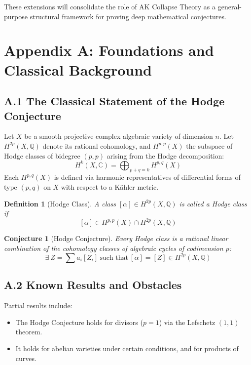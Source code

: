\documentclass[11pt]{article}
\newtheorem{definition}[theorem]{Definition}
\newtheorem{conjecture}{Conjecture}[section]
\begin{document}
These extensions will consolidate the role of AK Collapse Theory as a general-purpose structural framework for proving deep mathematical conjectures.



\appendix

\section*{Appendix A: Foundations and Classical Background}


\subsection*{A.1 The Classical Statement of the Hodge Conjecture}

Let $X$ be a smooth projective complex algebraic variety of dimension $n$.  
Let $H^{2p}(X, \mathbb{Q})$ denote its rational cohomology, and $H^{p,p}(X)$ the subspace of Hodge classes of bidegree $(p,p)$ arising from the Hodge decomposition:
\[
H^k(X, \mathbb{C}) = \bigoplus_{p+q=k} H^{p,q}(X)
\]
Each $H^{p,q}(X)$ is defined via harmonic representatives of differential forms of type $(p,q)$ on $X$ with respect to a Kähler metric.

\begin{definition}[Hodge Class]
A class $[\alpha] \in H^{2p}(X, \mathbb{Q})$ is called a \emph{Hodge class} if
\[
[\alpha] \in H^{p,p}(X) \cap H^{2p}(X, \mathbb{Q})
\]
\end{definition}

\begin{conjecture}[Hodge Conjecture]
Every Hodge class is a rational linear combination of the cohomology classes of algebraic cycles of codimension $p$:
\[
\exists \ Z = \sum a_i [Z_i] \ \text{such that} \ [\alpha] = [Z] \in H^{2p}(X, \mathbb{Q})
\]
\end{conjecture}

\subsection*{A.2 Known Results and Obstacles}

Partial results include:

\begin{itemize}
  \item The Hodge Conjecture holds for divisors ($p = 1$) via the Lefschetz $(1,1)$ theorem.
  \item It holds for abelian varieties under certain conditions, and for products of curves.
\end{itemize}
\end{document}
